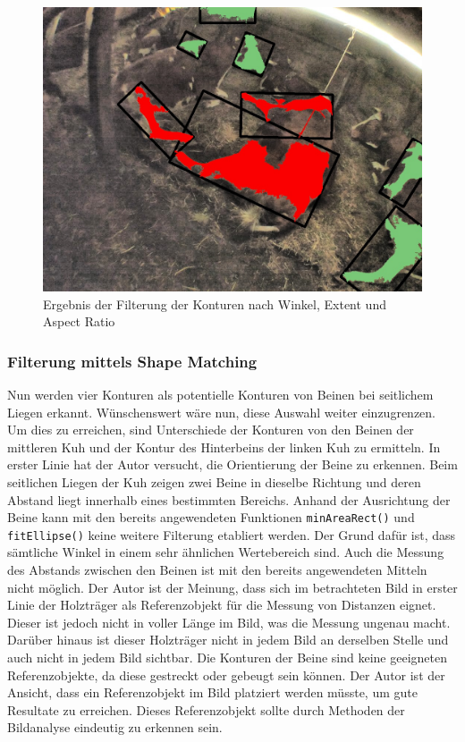 \begin{figure}[H]
	\center
	\includegraphics[scale=0.43]{Grafiken/entwicklung/30FilteredByExtentAspectAngle.jpg}
	\caption{Ergebnis der Filterung der Konturen nach Winkel, Extent und Aspect Ratio} 
	\label{fig: Ergebnis der Filterung der Konturen nach Winkel, Extent und Aspect Ratio} 
\end{figure}

\subsubsection{Filterung mittels Shape Matching }
Nun werden vier Konturen als potentielle Konturen von Beinen bei seitlichem Liegen erkannt. Wünschenswert wäre nun, diese Auswahl weiter einzugrenzen. Um dies zu erreichen, sind Unterschiede der Konturen von den Beinen der mittleren Kuh und der Kontur des Hinterbeins der linken Kuh zu ermitteln. In erster Linie hat der Autor versucht, die Orientierung der Beine zu erkennen. Beim seitlichen Liegen der Kuh zeigen zwei Beine in dieselbe Richtung und deren Abstand liegt innerhalb eines bestimmten Bereichs. Anhand der Ausrichtung der Beine kann mit den bereits angewendeten Funktionen \texttt{minAreaRect()} und \texttt{fitEllipse()} keine weitere Filterung etabliert werden. Der Grund dafür ist, dass sämtliche Winkel in einem sehr ähnlichen Wertebereich sind. Auch die Messung des Abstands zwischen den Beinen ist mit den bereits angewendeten Mitteln nicht möglich. Der Autor ist der Meinung, dass sich im betrachteten Bild in erster Linie der Holzträger als Referenzobjekt für die Messung von Distanzen eignet. Dieser ist jedoch nicht in voller Länge im Bild, was die Messung ungenau macht. Darüber hinaus ist dieser Holzträger nicht in jedem Bild an derselben Stelle und auch nicht in jedem Bild sichtbar. Die Konturen der Beine sind keine geeigneten Referenzobjekte, da diese gestreckt oder gebeugt sein können. Der Autor ist der Ansicht, dass ein Referenzobjekt im Bild platziert werden müsste, um gute Resultate zu erreichen. Dieses Referenzobjekt sollte durch Methoden der Bildanalyse eindeutig zu erkennen sein.

